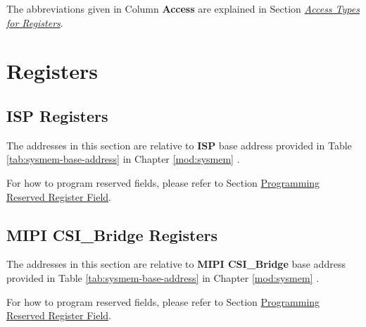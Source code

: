 \documentclass[main\_\_EN.tex]{subfiles}
\begin{document}
The abbreviations given in Column \textbf{Access} are explained in Section \hyperref[glossary-access-types]{\textit{Access Types for Registers}}.






\newpage
\section{Registers}

\subsection{ISP Registers}

The addresses in this section are relative to \textbf{ISP} base address provided in Table \ref{tab:sysmem-base-address} in Chapter \ref{mod:sysmem} \textit{}.

For how to program reserved fields, please refer to Section \hyperref[programming-reserved-field]{Programming Reserved Register Field}.




\subsection{MIPI CSI\_Bridge Registers}

The addresses in this section are relative to \textbf{MIPI CSI\_Bridge} base address provided in Table \ref{tab:sysmem-base-address} in Chapter \ref{mod:sysmem} \textit{}.

For how to program reserved fields, please refer to Section \hyperref[programming-reserved-field]{Programming Reserved Register Field}.


\end{document}
